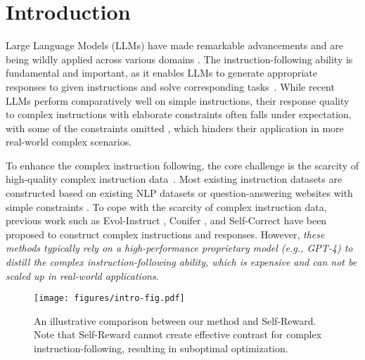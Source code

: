 \section{Introduction}

Large Language Models (LLMs) have made remarkable advancements and are being wildly applied across various domains \cite{zhao2024surveylargelanguagemodels,minaee2024large,hadi2024large,yin2024survey,wang2024survey}. The instruction-following ability is fundamental and important, as it enables LLMs to generate appropriate responses to given instructions and solve corresponding tasks~\cite{openai2024gpt4technicalreport}. 
While recent LLMs perform comparatively well on simple instructions, their response quality to complex instructions with elaborate constraints often falls under expectation, with some of the constraints omitted \cite{he2024complexsimpleenhancingmulticonstraint, jiang-etal-2024-followbench}, which hinders their application in more real-world complex scenarios.

To enhance the complex instruction following,
the core challenge 
is the scarcity of high-quality complex instruction data~\cite{lou2024large}. Most existing instruction datasets are constructed based on existing NLP datasets or question-answering websites with simple constraints \cite{camel2023,alpaca,OpenOrca,longpre2023flan}. To cope with the scarcity of complex instruction data, previous work such as Evol-Instruct \cite{xu2024wizardlm}, Conifer \cite{sun2024conifer}, and Self-Correct \cite{palmeira-ferraz-etal-2024-self-correction} have been proposed to construct complex instructions and responses. However, \textit{these methods typically rely on a high-performance proprietary model (e.g.,  GPT-4) to distill the complex instruction-following ability, which is expensive and can not be scaled up in real-world applications}.

\begin{figure}[t]
    \centering
    \texttt{[image: figures/intro-fig.pdf]}
    \caption{An illustrative comparison between our method and Self-Reward. Note that Self-Reward cannot create effective contrast for complex instruction-following, resulting in suboptimal optimization. }
    \label{fig: intro}
    \vspace{-1mm}
\end{figure}

